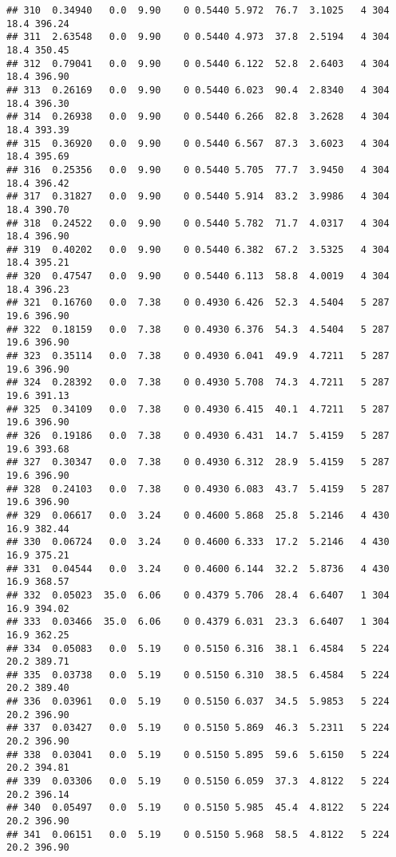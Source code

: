\documentclass[
]{article}
\begin{document}
\begin{verbatim}
## 310  0.34940   0.0  9.90    0 0.5440 5.972  76.7  3.1025   4 304    18.4 396.24
## 311  2.63548   0.0  9.90    0 0.5440 4.973  37.8  2.5194   4 304    18.4 350.45
## 312  0.79041   0.0  9.90    0 0.5440 6.122  52.8  2.6403   4 304    18.4 396.90
## 313  0.26169   0.0  9.90    0 0.5440 6.023  90.4  2.8340   4 304    18.4 396.30
## 314  0.26938   0.0  9.90    0 0.5440 6.266  82.8  3.2628   4 304    18.4 393.39
## 315  0.36920   0.0  9.90    0 0.5440 6.567  87.3  3.6023   4 304    18.4 395.69
## 316  0.25356   0.0  9.90    0 0.5440 5.705  77.7  3.9450   4 304    18.4 396.42
## 317  0.31827   0.0  9.90    0 0.5440 5.914  83.2  3.9986   4 304    18.4 390.70
## 318  0.24522   0.0  9.90    0 0.5440 5.782  71.7  4.0317   4 304    18.4 396.90
## 319  0.40202   0.0  9.90    0 0.5440 6.382  67.2  3.5325   4 304    18.4 395.21
## 320  0.47547   0.0  9.90    0 0.5440 6.113  58.8  4.0019   4 304    18.4 396.23
## 321  0.16760   0.0  7.38    0 0.4930 6.426  52.3  4.5404   5 287    19.6 396.90
## 322  0.18159   0.0  7.38    0 0.4930 6.376  54.3  4.5404   5 287    19.6 396.90
## 323  0.35114   0.0  7.38    0 0.4930 6.041  49.9  4.7211   5 287    19.6 396.90
## 324  0.28392   0.0  7.38    0 0.4930 5.708  74.3  4.7211   5 287    19.6 391.13
## 325  0.34109   0.0  7.38    0 0.4930 6.415  40.1  4.7211   5 287    19.6 396.90
## 326  0.19186   0.0  7.38    0 0.4930 6.431  14.7  5.4159   5 287    19.6 393.68
## 327  0.30347   0.0  7.38    0 0.4930 6.312  28.9  5.4159   5 287    19.6 396.90
## 328  0.24103   0.0  7.38    0 0.4930 6.083  43.7  5.4159   5 287    19.6 396.90
## 329  0.06617   0.0  3.24    0 0.4600 5.868  25.8  5.2146   4 430    16.9 382.44
## 330  0.06724   0.0  3.24    0 0.4600 6.333  17.2  5.2146   4 430    16.9 375.21
## 331  0.04544   0.0  3.24    0 0.4600 6.144  32.2  5.8736   4 430    16.9 368.57
## 332  0.05023  35.0  6.06    0 0.4379 5.706  28.4  6.6407   1 304    16.9 394.02
## 333  0.03466  35.0  6.06    0 0.4379 6.031  23.3  6.6407   1 304    16.9 362.25
## 334  0.05083   0.0  5.19    0 0.5150 6.316  38.1  6.4584   5 224    20.2 389.71
## 335  0.03738   0.0  5.19    0 0.5150 6.310  38.5  6.4584   5 224    20.2 389.40
## 336  0.03961   0.0  5.19    0 0.5150 6.037  34.5  5.9853   5 224    20.2 396.90
## 337  0.03427   0.0  5.19    0 0.5150 5.869  46.3  5.2311   5 224    20.2 396.90
## 338  0.03041   0.0  5.19    0 0.5150 5.895  59.6  5.6150   5 224    20.2 394.81
## 339  0.03306   0.0  5.19    0 0.5150 6.059  37.3  4.8122   5 224    20.2 396.14
## 340  0.05497   0.0  5.19    0 0.5150 5.985  45.4  4.8122   5 224    20.2 396.90
## 341  0.06151   0.0  5.19    0 0.5150 5.968  58.5  4.8122   5 224    20.2 396.90

\end{verbatim}
\end{document}
